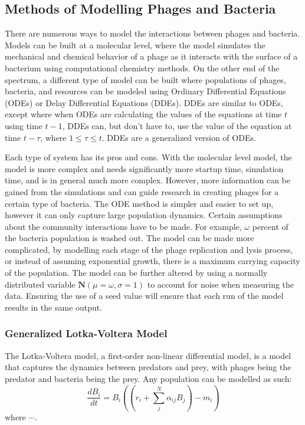 \subsection{Methods of Modelling Phages and Bacteria}
There are numerous ways to model the interactions between phages and bacteria.
Models can be built at a molecular level, where the model simulates the mechanical and chemical behavior of a phage as it interacts with the surface of a bacterium using computational chemistry methods.
On the other end of the spectrum, a different type of model can be built where populations of phages, bacteria, and resources can be modeled using Ordinary Differential Equations (ODEs) or Delay Differential Equations (DDEs).
DDEs are similar to ODEs, except where when ODEs are calculating the values of the equations at time $t$ using time $t-1$, DDEs can, but don't have to, use the value of the equation at time $t-\tau$, where $1 \leq \tau \leq t$. 
DDEs are a generalized version of ODEs. \newline 

Each type of system has its pros and cons.
With the molecular level model, the model is more complex and needs significantly more startup time, simulation time, and is in general much more complex.
However, more information can be gained from the simulations and can guide research in creating phages for a certain type of bacteria.
The ODE method is simpler and easier to set up, however it can only capture large population dynamics.
Certain assumptions about the community interactions have to be made.
For example, $\omega$ percent of the bacteria population is washed out.
The model can be made more complicated, by modelling each stage of the phage replication and lysis process, or instead of assuming exponential growth, there is a maximum carrying capacity of the population.
The model can be further altered by using a normally distributed variable $\textbf{N}(\mu=\omega, \sigma=1)$ to account for noise when measuring the data.
Ensuring the use of a seed value will ensure that each run of the model results in the same output. 

\subsubsection{Generalized Lotka-Voltera Model}
The Lotka-Voltera model, a first-order non-linear differential model, is a model that captures the dynamics between predators and prey, with phages being the predator and bacteria being the prey.
Any population can be modelled as such:
\[ 
    \frac{d{B}_i}{dt} = {B}_i \left(\left(r_i + \sum_{j}^{N} \alpha_{ij}{B}_j \right) - m_i\right)
\]
where $\cdots$.
 
